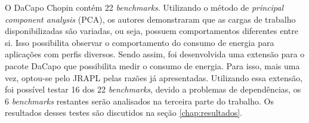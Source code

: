 
O DaCapo Chopin \cite{dacapochopin} contém 22 \textit{benchmarks}. Utilizando o método de \textit{principal component analysis} (PCA), os autores demonstraram que as cargas de trabalho disponibilizadas são variadas, ou seja, possuem comportamentos diferentes entre si. Isso possibilita observar o comportamento do consumo de energia para aplicações com perfis diversos. Sendo assim, foi desenvolvida uma extensão para o pacote DaCapo que possibilita medir o consumo de energia. Para isso, mais uma vez, optou-se pelo JRAPL \cite{jrapl} pelas razões já apresentadas. Utilizando essa extensão, foi possível testar 16 dos 22 \textit{benchmarks}, devido a problemas de dependências, os 6 \textit{benchmarks} restantes serão analisados na terceira parte do trabalho. Os resultados desses testes são discutidos na seção  \ref{chap:resultados}.